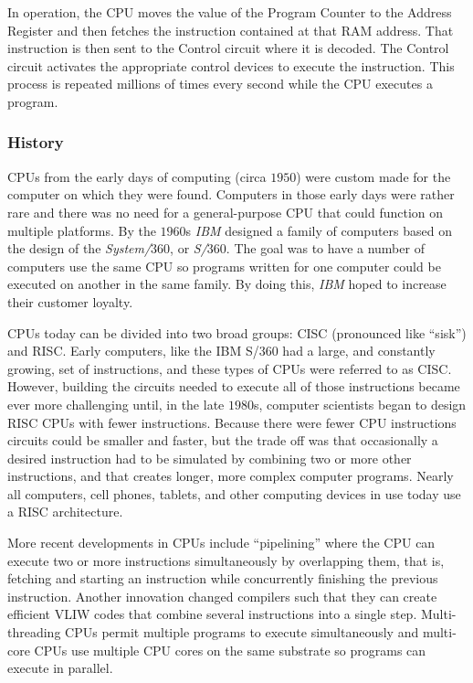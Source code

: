 In operation, the \ac{CPU} moves the value of the Program Counter to the Address Register and then fetches the instruction contained at that \ac{RAM} address. That instruction is then sent to the Control circuit where it is decoded. The Control circuit activates the appropriate control devices to execute the instruction. This process is repeated millions of times every second while the \ac{CPU} executes a program.

\subsubsection{History}

\acp{CPU} from the early days of computing (circa $ 1950 $) were custom made for the computer on which they were found. Computers in those early days were rather rare and there was no need for a general-purpose \ac{CPU} that could function on multiple platforms. By the $ 1960 $s \emph{IBM} designed a family of computers based on the design of the \emph{System/$ 360 $}, or \emph{S/$ 360 $}. The goal was to have a number of computers use the same \ac{CPU} so programs written for one computer could be executed on another in the same family. By doing this, \emph{IBM} hoped to increase their customer loyalty.

\acp{CPU} today can be divided into two broad groups: \ac{CISC} (pronounced like ``sisk'') and \ac{RISC}. Early computers, like the IBM S/$ 360 $ had a large, and constantly growing, set of instructions, and these types of \acp{CPU} were referred to as \ac{CISC}. However, building the circuits needed to execute all of those instructions became ever more challenging until, in the late $ 1980 $s, computer scientists began to design \ac{RISC} \acp{CPU} with fewer instructions. Because there were fewer \ac{CPU} instructions circuits could be smaller and faster, but the trade off was that occasionally a desired instruction had to be simulated by combining two or more other instructions, and that creates longer, more complex computer programs. Nearly all computers, cell phones, tablets, and other computing devices in use today use a \ac{RISC} architecture.

More recent developments in \acp{CPU} include ``pipelining'' where the \ac{CPU} can execute two or more instructions simultaneously by overlapping them, that is, fetching and starting an instruction while concurrently finishing the previous instruction. Another innovation changed compilers such that they can create efficient \ac{VLIW} codes that combine several instructions into a single step. Multi-threading \acp{CPU} permit multiple programs to execute simultaneously and multi-core \acp{CPU} use multiple \ac{CPU} cores on the same substrate so programs can execute in parallel. 

